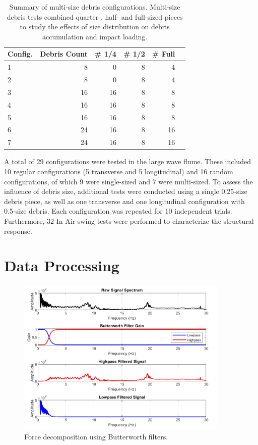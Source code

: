 \documentclass{article}
\begin{document}
{\begin{table}[h!]
\centering
\caption{Summary of multi-size debris configurations. Multi-size debris tests combined quarter-, half- and full-sized pieces to study the effects of size distribution on debris accumulation and impact loading.}
{\small
\begin{tabular}{l r r r r r}
\hline
\textbf{Config.} & \textbf{Debris Count} & \textbf{\# 1/4} & \textbf{\# 1/2 } & \textbf{\# Full} \\
\hline
1 & 8   & 0  & 8  & 4 \\
2 & 8  & 0  & 8  & 4 \\
3 & 16 & 16 & 8  & 8 \\
4 & 16  & 16 & 8  & 8 \\
5 & 16  & 16 & 8  & 8 \\
6 & 24  & 16 & 8  & 16 \\
7 & 24  & 16 & 8  & 16 \\
\hline
\end{tabular}
}
\label{tab:multi_size_configs}
\end{table}



A total of 29 configurations were tested in the large wave flume. These included 10 regular configurations (5 transverse and 5 longitudinal) and 16 random configurations, of which 9 were single-sized and 7 were multi-sized. To assess the influence of debris size, additional tests were conducted using a single 0.25-size debris piece, as well as one transverse and one longitudinal configuration with 0.5-size debris. Each configuration was repeated for 10 independent trials. Furthermore, 32 In-Air swing tests were performed to characterize the structural response.

\section{Data Processing}

\begin{figure}[htbp] \centering \includegraphics[width=0.9\textwidth]{high_low_pass.png} \caption{Force decomposition using Butterworth filters.} \label{fig:high_low_pass} \end{figure}

}
\end{document}
